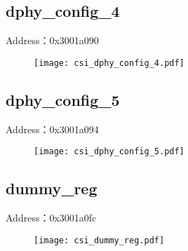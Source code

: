 \subsection{dphy\_config\_4}
\label{csi-dphy-config-4}
Address：0x3001a090
 \begin{figure}[H]
\texttt{[image: csi\_dphy\_config\_4.pdf]}
\end{figure}

\subsection{dphy\_config\_5}
\label{csi-dphy-config-5}
Address：0x3001a094
 \begin{figure}[H]
\texttt{[image: csi\_dphy\_config\_5.pdf]}
\end{figure}

\subsection{dummy\_reg}
\label{csi-dummy-reg}
Address：0x3001a0fc
 \begin{figure}[H]
\texttt{[image: csi\_dummy\_reg.pdf]}
\end{figure}

